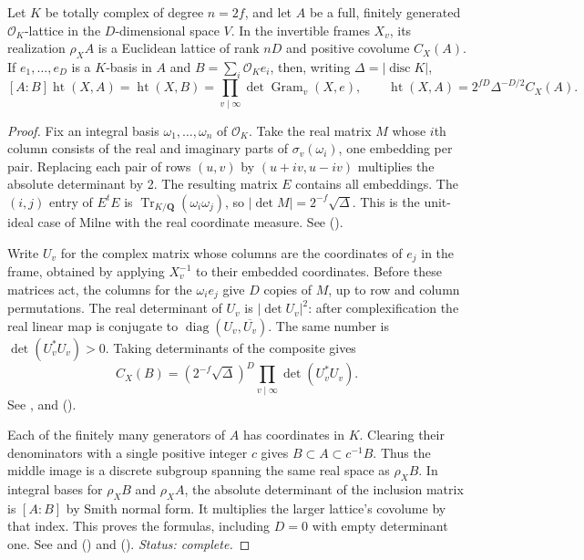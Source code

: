 \begin{lemma}\label{lem:P5-gram-realize}
Let $K$ be totally complex of degree $n=2f$, and let $A$ be a full,
finitely generated $\mathcal O_K$-lattice in the $D$-dimensional space
$V$. In the invertible frames $X_v$, its realization $\rho_X A$ is a
Euclidean lattice of rank $nD$ and positive covolume $C_X(A)$.
If $e_1,\ldots,e_D$ is a $K$-basis in $A$ and $B=\sum_i\mathcal O_K e_i$,
then, writing $\Delta=|\operatorname{disc}K|$,
\[
 [A:B]\operatorname{ht}(X,A)=\operatorname{ht}(X,B)
 =\prod_{v\mid\infty}\det\operatorname{Gram}_v(X,e),
 \qquad \operatorname{ht}(X,A)=2^{fD}\Delta^{-D/2}C_X(A).
\]
\end{lemma}
\begin{proof}
Fix an integral basis $\omega_1,\ldots,\omega_n$ of $\mathcal O_K$.
Take the real matrix $M$ whose $i$th column consists of the real and
imaginary parts of $\sigma_v(\omega_i)$, one embedding per pair.
Replacing each pair of rows $(u,v)$ by $(u+iv,u-iv)$ multiplies the
absolute determinant by 2. The resulting matrix $E$ contains all
embeddings. The $(i,j)$ entry of $E^{t}E$ is
$\operatorname{Tr}_{K/\mathbf Q}(\omega_i\omega_j)$, so
$|\det M|=2^{-f}\sqrt{\Delta}$. This is the unit-ideal case of
Milne \cite[Prop.~4.25]{P-Milne-Cheb} with the real coordinate measure.
See  ().

Write $U_v$ for the complex matrix whose columns are the coordinates
of $e_j$ in the frame, obtained by applying $X_v^{-1}$ to their
embedded coordinates. Before these matrices act, the columns for
the $\omega_i e_j$ give $D$ copies of $M$, up to row and column
permutations. The real determinant of $U_v$ is $|\det U_v|^2$:
after complexification the real linear map is conjugate to
$\operatorname{diag}(U_v,\overline{U_v})$. The same number is
$\det(U_v^*U_v)>0$. Taking determinants of the composite gives
\[
 C_X(B)=(2^{-f}\sqrt{\Delta})^D
           \prod_{v\mid\infty}\det(U_v^*U_v).
\]
See ,  and
 ().

Each of the finitely many generators of $A$ has coordinates in $K$.
Clearing their denominators with a single positive integer $c$ gives
$B\subset A\subset c^{-1}B$. Thus the middle image is a discrete
subgroup spanning the same real space as $\rho_X B$. In integral
bases for $\rho_X B$ and $\rho_X A$, the absolute determinant of the
inclusion matrix is $[A:B]$ by Smith normal form. It multiplies the
larger lattice's covolume by that index. This proves the formulas,
including $D=0$ with empty determinant one.
See  and 
() and
 ().
\emph{Status: complete.}
\end{proof}

